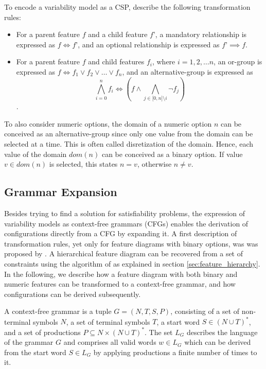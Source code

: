 To encode a variability model as a CSP, \cite{benavides_automated_2005} describe
the following transformation rules:

\begin{itemize}
  \item For a parent feature $f$ and a child feature $f’$, a mandatory
  relationship is expressed as $f \Leftrightarrow f’$, and an optional relationship is
  expressed as $f’ \implies f$.
    \item  For a parent feature $f$ and child features $f_i$, where $i = 1, 2,
    \ldots n$, an or-group is expressed as $f \Leftrightarrow f_1 \lor f_2 \lor
    \ldots \lor f_n$, and an alternative-group is expressed as $$\bigwedge_{i
    = 0}^n f_i \Leftrightarrow (f \land \bigwedge_{j \in \lbrack 0, n \rbrack
    \setminus i} \neg f_j) $$.
\end{itemize}

To also consider numeric options, the domain of a numeric option $n$ can be
conceived as an alternative-group since only one value from the domain can be
selected at a time. This is often called disretization of the domain. Hence,
each value of the domain $dom(n)$ can be conceived as a binary option. If value $v \in dom(n)$ is selected, this states $n = v$,
otherwise $n \neq v$.


\subsection{Grammar Expansion}
Besides trying to find a solution for satisfiability problems, the expression of
variability models as context-free grammars (CFGs) enables the derivation of
configurations directly from a CFG by expanding it. A
first description of transformation rules, yet only for feature diagrams with
binary options, was was proposed by \cite{batory_feature_2005}. A hierarchical feature diagram
can be recovered from a set of constraints using the algorithm of
\cite{she_reverse_2011} as explained in section \ref{sec:feature_hierarchy}.
In the following, we describe
how a feature diagram with both binary and numeric features can be transformed
to a context-free grammar, and how configurations can be derived subsequently.

\begin{definition}\label{def:cfg}
A context-free grammar is a tuple $G = (N, T, S, P)$, consisting of a set of
non-terminal symbols $N$, a set of terminal symbols $T$, a start word $S \in (N
\cup T)^*$, and a set of productions $P \subseteq N \times (N \cup T)^*$. The
set $L_G$ describes the language of the grammar $G$ and comprises all valid
words $w \in L_G$ which can be derived from the start word $S \in L_G$ by
applying productions a finite number of times to it.
\end{definition}

